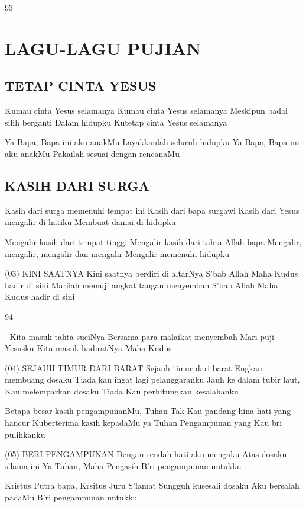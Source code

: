 \documentclass[10pt,a5paper,fancyhdr]{memoir}
\begin{document}
93 



\chapter*{LAGU-LAGU PUJIAN}

\renewcommand{\thesection}{\arabic{section}.}

\section{TETAP CINTA YESUS} 
Kumau cinta Yesus selamanya 
Kumau cinta Yesus selamanya 
Meskipun badai silih berganti Dalam hidupku 
Kutetap cinta Yesus selamanya 

Ya Bapa, Bapa ini aku anakMu 
Layakkanlah seluruh hidupku 
Ya Bapa, Bapa ini aku anakMu 
Pakailah sesuai dengan rencanaMu 

\section{KASIH DARI SURGA} 
Kasih dari surga memenuhi tempat ini 
Kasih dari bapa surgawi 
Kasih dari Yesus mengalir di hatiku 
Membuat damai di hidupku 

Mengalir kasih dari tempat tinggi 
Mengalir kasih dari tahta Allah bapa 
Mengalir, mengalir, mengalir dan mengalir 
Mengalir memenuhi hidupku 

(03) KINI SAATNYA 
Kini saatnya berdiri di altarNya 
S’bab Allah Maha Kudus hadir di sini 
Marilah memuji angkat tangan menyembah 
S’bab Allah Maha Kudus hadir di sini 

94 



Kita masuk tahta suciNya 
Bersama para malaikat menyembah 
Mari puji Yesusku 
Kita masuk hadiratNya Maha Kudus 

(04) SEJAUH TIMUR DARI BARAT 
Sejauh timur dari barat Engkau membuang dosaku 
Tiada kau ingat lagi pelanggaranku 
Jauh ke dalam tubir laut, Kau melemparkan dosaku 
Tiada Kau perhitungkan kesalahanku 

Betapa besar kasih pengampunanMu, Tuhan 
Tak Kau pandang hina hati yang hancur 
Kuberterima kasih kepadaMu ya Tuhan 
Pengampunan yang Kau bri pulihkanku 

(05) BERI PENGAMPUNAN 
Dengan rendah hati aku mengaku 
Atas dosaku s’lama ini 
Ya Tuhan, Maha Pengasih 
B’ri pengampunan untukku 

Kristus Putra bapa, Krsitus Juru S’lamat 
Sungguh kusesali dosaku 
Aku bersalah padaMu 
B’ri pengampunan untukku 
\end{document}
